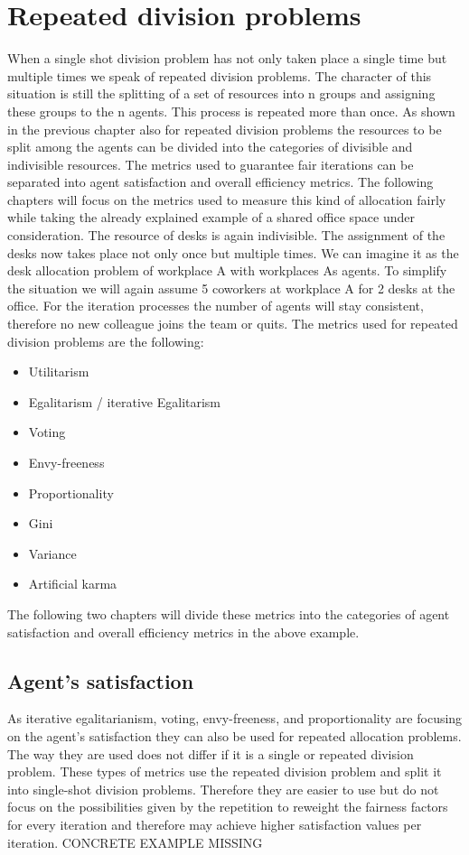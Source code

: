 \documentclass[german, a4paper, 11pt, oneside]{scrbook}
\begin{document}
\section{Repeated division problems}
When a single shot division problem has not only taken place a single time but multiple times we speak of repeated division problems. The character of this situation is still the splitting of a set of resources into n groups and assigning these groups to the n agents. This process is repeated more than once. As shown in the previous chapter also for repeated division problems the resources to be split among the agents can be divided into the categories of divisible and indivisible resources. The metrics used to guarantee fair iterations can be separated into agent satisfaction and overall efficiency metrics. The following chapters will focus on the metrics used to measure this kind of allocation fairly while taking the already explained example of a shared office space under consideration. The resource of desks is again indivisible. The assignment of the desks now takes place not only once but multiple times. We can imagine it as the desk allocation problem of workplace A with workplaces As agents. To simplify the situation we will again assume 5 coworkers at workplace A for 2 desks at the office. For the iteration processes the number of agents will stay consistent, therefore no new colleague joins the team or quits. The metrics used for repeated division problems are the following:
\begin{itemize}
  \item Utilitarism
  \item Egalitarism / iterative Egalitarism
  \item Voting
  \item Envy-freeness
  \item Proportionality
\item Gini
\item Variance
\item Artificial karma
\end{itemize}
The following two chapters will divide these metrics into the categories of agent satisfaction and overall efficiency metrics in the above example.
\subsection{Agent's satisfaction}
As iterative egalitarianism, voting, envy-freeness, and proportionality are focusing on the agent's satisfaction they can also be used for repeated allocation problems. The way they are used does not differ if it is a single or repeated division problem. These types of metrics use the repeated division problem and split it into single-shot division problems. Therefore they are easier to use but do not focus on the possibilities given by the repetition to reweight the fairness factors for every iteration and therefore may achieve higher satisfaction values per iteration.
CONCRETE EXAMPLE MISSING
\end{document}
